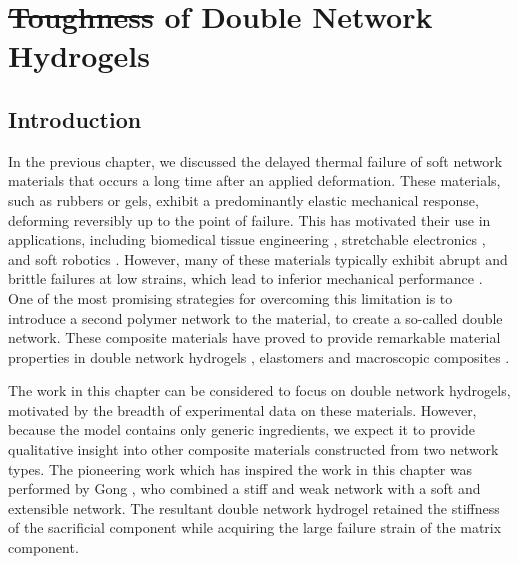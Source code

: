 \documentclass[asymmetricmargins]{library/duthesis}%
\providecommand{\DIFadd}[1]{{\protect\color{blue}\uwave{#1}}} %
\providecommand{\DIFdel}[1]{{\protect\color{red}\sout{#1}}}                      %
\providecommand{\DIFaddbegin}{} %
\providecommand{\DIFaddend}{} %
\providecommand{\DIFdelbegin}{} %
\providecommand{\DIFdelend}{} %
\begin{document}
 \newpage 
 \newpage %

\setcounter{equation}{0}
\chapter{\DIFdelbegin \DIFdel{Toughness }\DIFdelend \DIFaddbegin \DIFadd{Failure and Toughening }\DIFaddend of Double Network Hydrogels} \label{sec:DoubleNetworks}

\section{Introduction}

In the previous chapter, we discussed the delayed thermal failure of soft network materials that occurs a long time after an applied deformation. These materials, such as rubbers or gels, exhibit a predominantly elastic mechanical response, deforming reversibly up to the point of failure. This has motivated their use in applications, including biomedical tissue engineering \cite{leeHydrogelsTissueEngineering2001}, stretchable electronics \cite{rogers_materials_2010}, and soft robotics \cite{martinezSoftActuatorsRobots2014}. However, many of these materials typically exhibit abrupt and brittle failures at low strains, which lead to inferior mechanical performance \cite{Creton50th2017}. One of the most promising strategies for overcoming this limitation is to introduce a second polymer network to the material, to create a so-called double network. These composite materials have proved to provide remarkable material properties in double network hydrogels \cite{gong_why_2010, nakajima_synthesis_2013, sun_highly_2012, xin_effect_2013}, elastomers \cite{ducrot_toughening_2014, millereauMechanicsElastomericMolecular2018} and macroscopic composites \cite{kingMacroscaleDoubleNetworks2019,takahashiCreatingStiffTough2018}.

The work in this chapter can be considered to focus on double network hydrogels, motivated by the breadth of experimental data on these materials. However, because the model contains only generic ingredients, we expect it to provide qualitative insight into other composite materials constructed from two network types. The pioneering work which has inspired the work in this chapter was performed by Gong \etal \cite{gong_double-network_2003}, who combined a stiff and weak  network with a soft and extensible  network. The resultant double network hydrogel retained the stiffness of the sacrificial component while acquiring the large failure strain of the matrix component.
\end{document}
